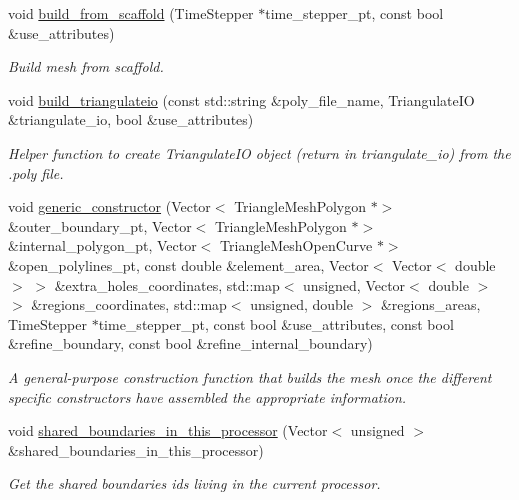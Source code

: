 \begin{DoxyCompactItemize}
\item 
void \hyperlink{classoomph_1_1TriangleMesh_a82ccf74f4e2befe3a6acd458d4e37c35}{build\+\_\+from\+\_\+scaffold} (Time\+Stepper $\ast$time\+\_\+stepper\+\_\+pt, const bool \&use\+\_\+attributes)
\begin{DoxyCompactList}\small\item\em Build mesh from scaffold. \end{DoxyCompactList}\item 
void \hyperlink{classoomph_1_1TriangleMesh_a1b18773cfdc79964dc7ae58dd11c2862}{build\+\_\+triangulateio} (const std\+::string \&poly\+\_\+file\+\_\+name, Triangulate\+IO \&triangulate\+\_\+io, bool \&use\+\_\+attributes)
\begin{DoxyCompactList}\small\item\em Helper function to create Triangulate\+IO object (return in triangulate\+\_\+io) from the .poly file. \end{DoxyCompactList}\item 
void \hyperlink{classoomph_1_1TriangleMesh_a2cdd830462582e6e004dee54ce8f1e2c}{generic\+\_\+constructor} (Vector$<$ Triangle\+Mesh\+Polygon $\ast$$>$ \&outer\+\_\+boundary\+\_\+pt, Vector$<$ Triangle\+Mesh\+Polygon $\ast$$>$ \&internal\+\_\+polygon\+\_\+pt, Vector$<$ Triangle\+Mesh\+Open\+Curve $\ast$$>$ \&open\+\_\+polylines\+\_\+pt, const double \&element\+\_\+area, Vector$<$ Vector$<$ double $>$ $>$ \&extra\+\_\+holes\+\_\+coordinates, std\+::map$<$ unsigned, Vector$<$ double $>$ $>$ \&regions\+\_\+coordinates, std\+::map$<$ unsigned, double $>$ \&regions\+\_\+areas, Time\+Stepper $\ast$time\+\_\+stepper\+\_\+pt, const bool \&use\+\_\+attributes, const bool \&refine\+\_\+boundary, const bool \&refine\+\_\+internal\+\_\+boundary)
\begin{DoxyCompactList}\small\item\em A general-\/purpose construction function that builds the mesh once the different specific constructors have assembled the appropriate information. \end{DoxyCompactList}\item 
void \hyperlink{classoomph_1_1TriangleMesh_a3fa21c284395e87058afd244e3f04155}{shared\+\_\+boundaries\+\_\+in\+\_\+this\+\_\+processor} (Vector$<$ unsigned $>$ \&shared\+\_\+boundaries\+\_\+in\+\_\+this\+\_\+processor)
\begin{DoxyCompactList}\small\item\em Get the shared boundaries ids living in the current processor. \end{DoxyCompactList}\item 
$$
\end{DoxyCompactItemize}
